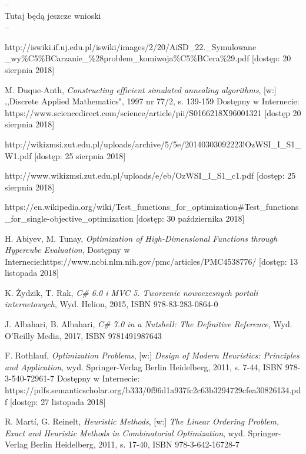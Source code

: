 \documentclass[twoside]{projektInzynierskiMS1}
\newcommand{\si}{ś}
\begin{document}
--\\
Tutaj będą jeszcze wnioski\\
--\\
%
%

\begin{thebibliography}{12}

 http://iswiki.if.uj.edu.pl/iswiki/images/2/20/AiSD\_22.\_Symulowane \_wy\%C5\%BCarzanie\_\%28problem\_komiwoja\%C5\%BCera\%29.pdf [dostęp: 20 sierpnia 2018]

 M. Duque-Anth, \textit{Constructing efficient simulated annealing algorithms}, [w:] ,,Discrete Applied Mathematics", 1997 nr 77/2, s. 139-159 Dostępny w Internecie: https://www.sciencedirect.com/science/article/pii/S0166218X96001321
[dostęp 20 sierpnia 2018]

 http://wikizmsi.zut.edu.pl/uploads/archive/5/5e/20140303092223!OzWSI\_I\_S1\_W1.pdf
[dostęp: 25 sierpnia 2018]

 http://www.wikizmsi.zut.edu.pl/uploads/e/eb/OzWSI\_I\_S1\_c1.pdf
[dostęp: 25 sierpnia 2018]

 https://en.wikipedia.org/wiki/Test\_functions\_for\_optimization\#Test\_functions\_for\_single-objective\_optimization [dostęp: 30 października 2018]

 H. Abiyev, M. Tunay, \textit{Optimization of High-Dimensional Functions through Hypercube Evaluation}, Dostępny w Internecie:https://www.ncbi.nlm.nih.gov/pmc/articles/PMC4538776/
[dostęp: 13 listopada 2018]

 K. Żydzik, T. Rak,  \textit{C\# 6.0 i MVC 5. Tworzenie nowoczesnych portali internetowych}, Wyd. Helion, 2015, ISBN 
978-83-283-0864-0

 J. Albahari, B. Albahari, \textit{C\# 7.0 in a Nutshell: The Definitive Reference}, Wyd. O'Reilly Media, 2017, ISBN 9781491987643


 F. Rothlauf, \textit{Optimization Problems}, [w:] \textit{Design of Modern Heuristics: Principles and Application}, wyd. Springer-Verlag Berlin Heidelberg, 2011, s. 7-44, ISBN 978-3-540-72961-7
Dostępny w Internecie: https://pdfs.semanticscholar.org/b333/0f96d1a937fc2c63b3294729cfea30826134.pdf
[dostęp: 27 listopada 2018]

 R. Martí, G. Reinelt, \textit{Heuristic Methods}, [w:] \textit{The Linear Ordering Problem, Exact and Heuristic Methods in Combinatorial Optimization}, wyd. Springer-Verlag Berlin Heidelberg, 2011, s. 17-40, ISBN 978-3-642-16728-7


\end{thebibliography}
\end{document}
